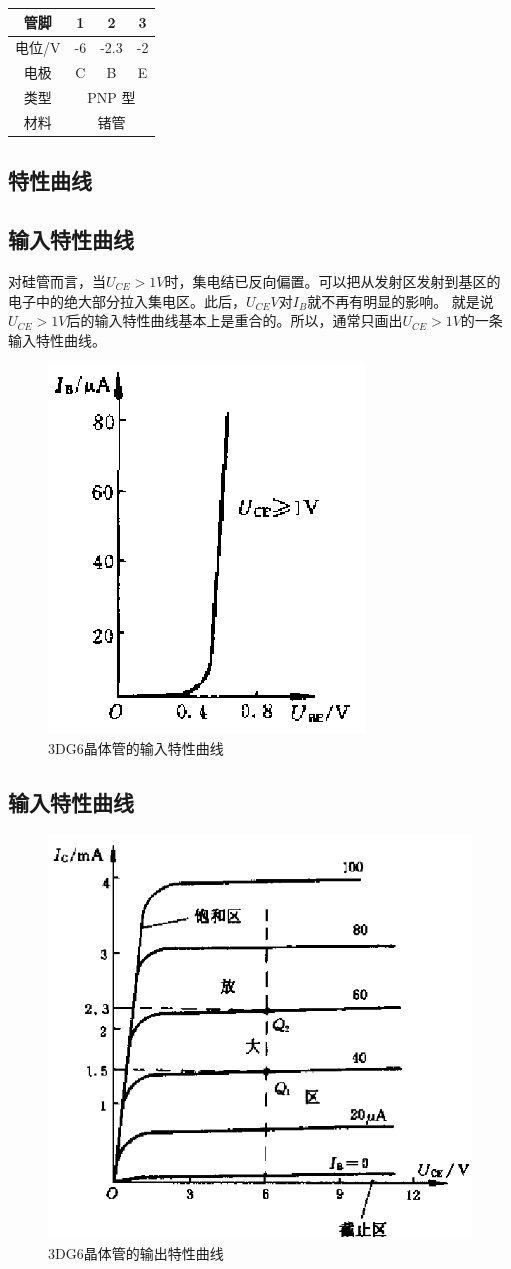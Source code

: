 \documentclass[12pt]{article}
\begin{document}
\begin{table}[!h]
    \centering
    \begin{tabular}{c|c|c|c}
    \hline 管脚 & 1 & 2 & 3 \\
    \hline 电位/V & -6 & -2.3 & -2 \\
    \hline 电极 & C & B & E \\
    \hline 类型 & \multicolumn{3}{|c}{ PNP 型 } \\
    \hline 材料 & \multicolumn{3}{|c}{ 锗管 } \\
    \hline
    \end{tabular}
\end{table}

\subsection{特性曲线}

\subsection{输入特性曲线}

对硅管而言，当\(U_{CE}>1V\)时，集电结已反向偏置。可以把从发射区发射到基区的电子中的绝大部分拉入集电区。此后，\(U_{CE}V\)对\(I_{B}\)就不再有明显的影响。 就是说\(U_{CE}>1V\)后的输入特性曲线基本上是重合的。所以，通常只画出\(U_{CE}>1V\)的一条输入特性曲线。
\begin{figure}[!h]
    \centering
    \includegraphics[width=.2\textwidth]{graphics/3DG6晶体管的输入特性曲线.png}
    \caption{3DG6晶体管的输入特性曲线}
\end{figure}

\subsection{输入特性曲线}

\begin{figure}[!h]
    \centering
    \includegraphics[width=.25\textwidth]{graphics/屏幕截图 2025-10-09 090405.png}
    \caption{3DG6晶体管的输出特性曲线}
\end{figure}
\end{document}
